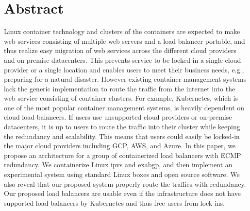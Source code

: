 \chapter*{Abstract}

Linux container technology and clusters of the containers are expected to make web services consisting of multiple web servers and a load balancer portable, and thus realize easy migration of web services across the different cloud providers and on-premise datacenters.
This prevents service to be locked-in a single cloud provider or a single location and enables users to meet their business needs, e.g., preparing for a natural disaster.
However existing container management systems lack the generic implementation to route the traffic from the internet into the web service consisting of container clusters.
For example, Kubernetes, which is one of the most popular container management systems, is heavily dependent on cloud load balancers. If users use unsupported cloud providers or on-premise datacenters, it is up to users to route the traffic into their cluster while keeping the redundancy and scalability.
This means that users could easily be locked-in the major cloud providers including GCP, AWS, and Azure.
In this paper, we propose an architecture for a group of containerized load balancers with ECMP redundancy.
We containerize Linux ipvs and exabgp, and then implement an experimental system using standard Linux boxes and open source software.
We also reveal that our proposed system properly route the traffics with redundancy.
Our proposed load balancers are usable even if the infrastructure does not have supported load balancers by Kubernetes and thus free users from lock-ins.


